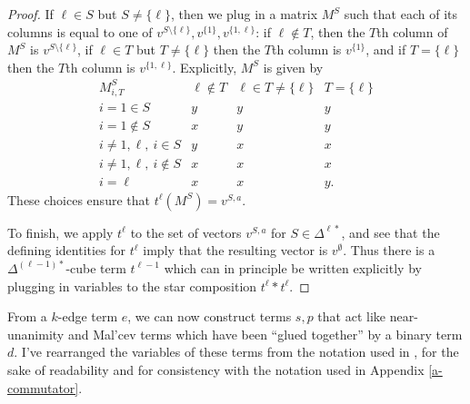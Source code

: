 \begin{proof}
If $\ell \in S$ but $S \ne \{\ell\}$, then we plug in a matrix $M^S$ such that each of its columns is equal to one of $v^{S\setminus \{\ell\}}, v^{\{1\}}, v^{\{1,\ell\}}$: if $\ell \not\in T$, then the $T$th column of $M^S$ is $v^{S\setminus \{\ell\}}$, if $\ell \in T$ but $T \ne \{\ell\}$ then the $T$th column is $v^{\{1\}}$, and if $T = \{\ell\}$ then the $T$th column is $v^{\{1,\ell\}}$. Explicitly, $M^S$ is given by
\[
\begin{array}{c|ccc} M^S_{i,T} & \ell \not\in T & \ell \in T \ne \{\ell\} & T = \{\ell\}\\ \hline i = 1 \in S & y & y & y \\ i = 1 \not\in S & x & y & y \\ i \ne 1,\ell,\ i \in S & y & x & x\\ i \ne 1,\ell,\ i \not\in S & x & x & x\\ i = \ell & x & x & y.\end{array}
\]
These choices ensure that $t^\ell(M^S) = v^{S,a}$.%

To finish, we apply $t^\ell$ to the set of vectors $v^{S,a}$ for $S \in \Delta^{\ell *}$, and see that the defining identities for $t^\ell$ imply that the resulting vector is $v^\emptyset$. Thus there is a $\Delta^{(\ell-1)*}$-cube term $t^{\ell-1}$ which can in principle be written explicitly by plugging in variables to the star composition $t^\ell * t^\ell$.
\end{proof}

From a $k$-edge term $e$, we can now construct terms $s,p$ that act like near-unanimity and Mal'cev terms which have been ``glued together'' by a binary term $d$. I've rearranged the variables of these terms from the notation used in \cite{few-subpowers}, for the sake of readability and for consistency with the notation used in Appendix \ref{a-commutator}.%


